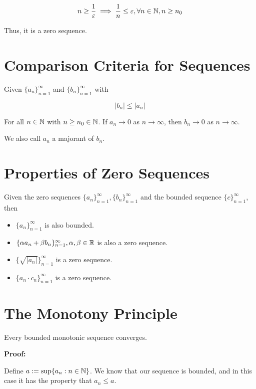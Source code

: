 \[
	n \ge \frac{1}{\varepsilon} \implies \frac{1}{n} \le \varepsilon, \forall n \in \mathbb{N}, n \ge n_0
\]

Thus, it is a zero sequence.

\section{Comparison Criteria for Sequences}

Given \(\{a_n\}_{n = 1}^{\infty}\) and \(\{b_n\}_{n = 1}^{\infty}\) with

\[
	|b_n| \le |a_n|
\]

For all \(n \in \mathbb{N}\) with \(n \ge n_0 \in \mathbb{N}\). If  \(a_n \to 0\) as \(n \to \infty\), then
\(b_n \to 0\) as \(n \to \infty\).

We also call \(a_n\) a majorant of \(b_n\).

\section{Properties of Zero Sequences}

Given the zero sequences \(\{a_n\}_{n = 1}^{\infty}, \{b_n\}_{n = 1}^{\infty}\)  and  the bounded sequence \(\{c\}_{n = 1}^{\infty}\), then

\begin{itemize}

	\item \(\{a_n\}_{n = 1}^{\infty}\) is also bounded.

	\item \(\{\alpha a_n + \beta b_n\}_{n = 1}^{\infty}, \alpha, \beta \in \mathbb{R}\) is also a zero sequence.

	\item \(\{\sqrt{|a_n|}\}_{n = 1}^{\infty}\) is a zero sequence.

	\item \(\{a_n \cdot c_n\}_{n = 1}^{\infty}\) is a zero sequence.

\end{itemize}

\section{The Monotony Principle}

Every bounded monotonic sequence converges.

\textbf{Proof:}

Define \(a:= \sup\{a_n: n \in \mathbb{N}\}\). We know that our sequence is bounded, and in this case it has the
property that \(a_n \le a\).

